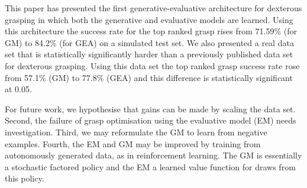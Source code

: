 This paper has presented the first generative-evaluative architecture for dexterous grasping in which both the generative and evaluative models are learned. Using this architecture the success rate for the top ranked grasp rises from 71.59\% (for GM) to 84.2\% (for GEA) on a simulated test set. We also presented a real data set that is statistically significantly harder than a previously published data set for dexterous grasping. Using this data set the top ranked grasp success rate rose from 57.1\% (GM) to 77.8\% (GEA) and this difference is statistically significant at 0.05.

For future work, we hypothesise that gains can be made by scaling the data set. Second, the failure of grasp optimisation using the evaluative model (EM) needs investigation. Third, we may reformulate the GM to learn from negative examples. Fourth, the EM and GM may be improved by training from autonomously generated data, as in reinforcement learning. The GM is essentially a stochastic factored policy and the EM a learned value function for draws from this policy. 